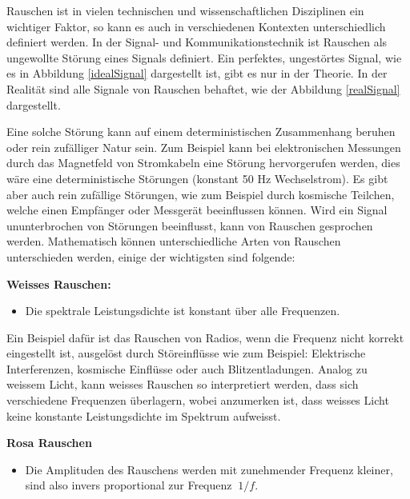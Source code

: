 Rauschen ist in vielen technischen und wissenschaftlichen Disziplinen ein wichtiger Faktor, so kann es auch in verschiedenen Kontexten unterschiedlich definiert werden. In der Signal- und Kommunikationstechnik ist Rauschen als ungewollte Störung eines Signals definiert. Ein perfektes, ungestörtes Signal, wie es in Abbildung \ref{idealSignal} dargestellt ist, gibt es nur in der Theorie. In der Realität sind alle Signale von Rauschen behaftet, wie der Abbildung \ref{realSignal} dargestellt.

Eine solche Störung kann auf einem deterministischen Zusammenhang beruhen oder rein zufälliger Natur sein. Zum Beispiel kann bei elektronischen Messungen durch das Magnetfeld von Stromkabeln eine Störung hervorgerufen werden, dies wäre eine deterministische Störungen (konstant 50 Hz Wechselstrom). Es gibt aber auch rein zufällige Störungen, wie zum Beispiel durch kosmische Teilchen, welche einen Empfänger oder Messgerät beeinflussen können. Wird ein Signal ununterbrochen von Störungen beeinflusst, kann von Rauschen gesprochen werden. Mathematisch können unterschiedliche Arten von Rauschen unterschieden werden, einige der wichtigsten sind folgende: 

\begin{definition}{\bf Weisses Rauschen:}
	\begin{itemize}
		\item Die spektrale Leistungsdichte ist konstant über alle Frequenzen. 
	\end{itemize}
\end{definition}


Ein Beispiel dafür ist das Rauschen von Radios, wenn die Frequenz nicht korrekt eingestellt ist, ausgelöst durch Störeinflüsse wie zum Beispiel: Elektrische Interferenzen, kosmische Einflüsse oder auch Blitzentladungen. Analog zu weissem Licht, kann weisses Rauschen so interpretiert werden, dass sich verschiedene Frequenzen überlagern, wobei anzumerken ist, dass weisses Licht keine konstante Leistungsdichte im Spektrum aufweisst.

\begin{definition}{\bf Rosa Rauschen}
	\begin{itemize}
		\item Die Amplituden des Rauschens werden mit zunehmender Frequenz kleiner, sind also invers proportional zur Frequenz $ ~1/f $.
	\end{itemize}
\end{definition}



